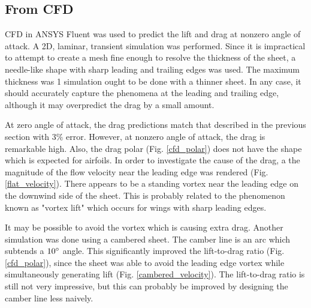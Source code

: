 \documentclass[12pt]{report} %
\begin{document}
\subsection{From CFD}
CFD in ANSYS Fluent was used to predict the lift and drag at nonzero angle of attack. A 2D, laminar, transient simulation was performed.
Since it is impractical to attempt to create a mesh fine enough to resolve the thickness of the sheet, a needle-like shape with sharp
leading and trailing edges was used. The maximum thickness was 1%
simulation ought to be done with a thinner sheet. In any case, it should accurately capture the phenomena at the leading and trailing edge,
although it may overpredict the drag by a small amount.

At zero angle of attack, the drag predictions match that described in the previous section with $3\%$ error. However,
at nonzero angle of attack,
the drag is remarkable high. Also, the drag polar (Fig. \ref{cfd_polar}) does
not have the shape which is expected for airfoils. In order to investigate
the cause of the drag, a the magnitude of the flow velocity near the leading edge was rendered (Fig. \ref{flat_velocity}). There appears
to be a
standing vortex near the leading edge on the downwind side of the sheet. This is probably related to the phenomenon known as "vortex lift"
which occurs for wings with sharp leading edges.

It may be possible to avoid the vortex which is causing extra drag. Another simulation was done using a cambered sheet. The camber line
is an arc which subtends a $10\degree$ angle. This significantly improved the lift-to-drag ratio (Fig. \ref{cfd_polar}), since the sheet was
able to avoid the
leading edge vortex while simultaneously generating lift (Fig. \ref{cambered_velocity}). The lift-to-drag ratio is still not very impressive,
but this can probably be
improved by designing the camber line less naively.
\end{document}
